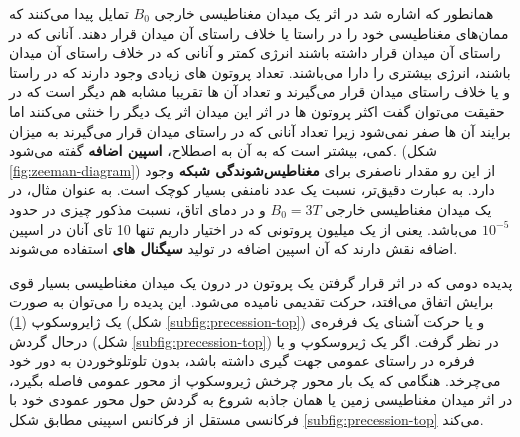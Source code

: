 همانطور که اشاره شد در اثر یک میدان مغناطیسی خارجی $B_0$ تمایل پیدا می‌کنند که ممان‌های مغناطیسی خود را در راستا یا خلاف راستای آن میدان قرار دهند. آنانی که در راستای آن میدان قرار داشته باشند انرژی کمتر و آنانی که در خلاف راستای آن میدان باشند، انرژی بیشتری را دارا می‌باشند.  تعداد پروتون های زیادی وجود دارند که در راستا و یا خلاف راستای میدان قرار می‌گیرند و تعداد آن ها تقریبا مشابه هم دیگر است که در حقیقت می‌توان گفت اکثر پروتون ها در اثر این میدان  اثر یک دیگر را خنثی می‌کنند اما برایند آن ها صفر نمی‌شود زیرا تعداد آنانی که در راستای میدان قرار می‌گیرند به میزان کمی، بیشتر است که به آن به اصطلاح، \textbf{اسپین اضافه}
گفته می‌شود.
(شکل \ref{fig:zeeman-diagram})
از این رو مقدار ناصفری برای \textbf{مغناطیس‌شوندگی شبکه} 
وجود دارد.
به عبارت دقیق‌تر، نسبت 
یک عدد نامنفی بسیار کوچک است. به عنوان مثال، در یک میدان مغناطیسی خارجی $B_0 = 3 T$ و در دمای اتاق، نسبت مذکور چیزی در حدود $10^{-5}$ می‌باشد. یعنی از یک میلیون پروتونی که در اختیار داریم تنها 10 تای آنان در اسپین اضافه نقش دارند که آن اسپین اضافه در تولید \textbf{سیگنال های \mr}
استفاده می‌شوند.
\begin{figure}
	\centering
	\caption{}
	\label{fig:gyroscope-components}
\end{figure}



پدیده دومی که در اثر قرار گرفتن یک پروتون در درون یک میدان مغناطیسی بسیار قوی برایش اتفاق می‌افتد، حرکت تقدیمی نامیده می‌شود. این پدیده را می‌توان به صورت یک ژایروسکوپ 
(\ref{fig:gyroscope-components})
(شکل \ref{subfig:precession-top}) و یا حرکت آشنای یک فرفره‌ی درحال گردش (شکل \ref{subfig:precession-top})
در نظر گرفت. اگر یک ژیروسکوپ و یا فرفره در راستای عمومی جهت گیری داشته باشد، بدون تلوتلو‌خوردن
به دور خود می‌چرخد. هنگامی که یک بار محور چرخش ژیروسکوپ از محور عمومی فاصله بگیرد، در اثر میدان مغناطیسی زمین یا همان جاذبه
 شروع به گردش حول محور عمودی خود با فرکانسی مستقل از فرکانس اسپینی مطابق شکل \ref{subfig:precession-top}
می‌کند. 

